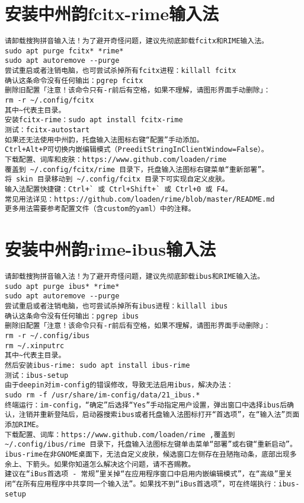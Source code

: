 \documentclass[a4paper,fontset=fandol,zihao=-4,linespread=1.2,oneside]{ctexbook}
\begin{document}
\section{安装中州韵fcitx-rime输入法}
\begin{lstlisting}
请卸载搜狗拼音输入法！为了避开奇怪问题，建议先彻底卸载fcitx和RIME输入法。
sudo apt purge fcitx* *rime*
sudo apt autoremove --purge
尝试重启或者注销电脑，也可尝试杀掉所有fcitx进程：killall fcitx
确认这条命令没有任何输出：pgrep fcitx
删除旧配置「注意！该命令只有-r前后有空格，如果不理解，请图形界面手动删除」：
rm -r ~/.config/fcitx
其中~代表主目录。
安装fcitx-rime：sudo apt install fcitx-rime
测试：fcitx-autostart
如果还无法使用中州韵，托盘输入法图标右键“配置”手动添加。
Ctrl+Alt+P可切换内嵌编辑模式（PreeditStringInClientWindow=False）。
下载配置、词库和皮肤：https://www.github.com/loaden/rime
覆盖到 ~/.config/fcitx/rime 目录下，托盘输入法图标右键菜单“重新部署”。
将 skin 目录移动到 ~/.config/fcitx 目录下可实现自定义皮肤。
输入法配置快捷键：Ctrl+` 或 Ctrl+Shift+` 或 Ctrl+0 或 F4。
常见用法详见：https://github.com/loaden/rime/blob/master/README.md
更多用法需要参考配置文件（含custom的yaml）中的注释。
\end{lstlisting}

\section{安装中州韵rime-ibus输入法}
\begin{lstlisting}
请卸载搜狗拼音输入法！为了避开奇怪问题，建议先彻底卸载ibus和RIME输入法。
sudo apt purge ibus* *rime*
sudo apt autoremove --purge
尝试重启或者注销电脑，也可尝试杀掉所有ibus进程：killall ibus
确认这条命令没有任何输出：pgrep ibus
删除旧配置「注意！该命令只有-r前后有空格，如果不理解，请图形界面手动删除」：
rm -r ~/.config/ibus
rm ~/.xinputrc
其中~代表主目录。
然后安装ibus-rime: sudo apt install ibus-rime
测试：ibus-setup
由于deepin对im-config的错误修改，导致无法启用ibus，解决办法：
sudo rm -f /usr/share/im-config/data/21_ibus.*
终端运行：im-config，“确定”后选择“Yes”手动指定用户设置，弹出窗口中选择ibus后确认，注销并重新登陆后，启动器搜索ibus或者托盘输入法图标打开“首选项”，在“输入法”页面添加RIME。
下载配置、词库：https://www.github.com/loaden/rime ,覆盖到 ~/.config/ibus/rime 目录下，托盘输入法图标左键单击菜单“部署”或右键“重新启动”。ibus-rime在非GNOME桌面下，无法自定义皮肤，候选窗口左侧存在丑陋拖动条，底部出现多余上、下箭头。如果你知道怎么解决这个问题，请不吝赐教。
建议在“iBus首选项 - 常规”里关掉“在应用程序窗口中启用内嵌编辑模式”，在“高级”里关闭“在所有应用程序中共享同一个输入法”。如果找不到“iBus首选项”，可在终端执行：ibus-setup
\end{lstlisting}
\end{document}
